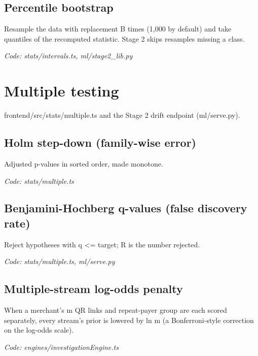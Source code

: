 \documentclass[11pt,a4paper]{article}
\newcommand{\where}[1]{\par{\small\itshape\color{mute}Code: #1}\par}
\begin{document}
\subsection*{Percentile bootstrap}
\par\smallskip\noindent{}\par\smallskip
Resample the data with replacement B times (1,000 by default) and take quantiles of the recomputed statistic. Stage 2 skips resamples missing a class.
\where{stats/intervals.ts, ml/stage2\_lib.py}

\clearpage
\section{Multiple testing}
{\color{mute}frontend/src/stats/multiple.ts and the Stage 2 drift endpoint (ml/serve.py).}

\subsection*{Holm step-down (family-wise error)}
\par\smallskip\noindent{}\par\smallskip
Adjusted p-values in sorted order, made monotone.
\where{stats/multiple.ts}

\subsection*{Benjamini-Hochberg q-values (false discovery rate)}
\par\smallskip\noindent{}\par\smallskip
Reject hypotheses with q \textless{}= target; R is the number rejected.
\where{stats/multiple.ts, ml/serve.py}

\subsection*{Multiple-stream log-odds penalty}
\par\smallskip\noindent{}\par\smallskip
When a merchant's m QR links and repeat-payer group are each scored separately, every stream's prior is lowered by ln m (a Bonferroni-style correction on the log-odds scale).
\where{engines/investigationEngine.ts}
\end{document}
